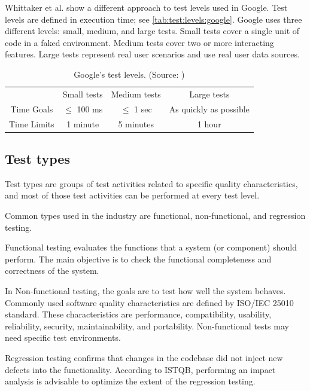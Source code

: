 Whittaker et al. show \cite{google:2012} a different approach to test levels used
in Google.
Test levels are defined in execution time; see \autoref{tab:test:levels:google}.
Google uses three different levels: small, medium, and large tests.
Small tests cover a single unit of code in a faked environment.
Medium tests cover two or more interacting features.
Large tests represent real user scenarios and use real user data sources.

\begin{table}
    \centering
    \begin{tabular}{|c c c c|}
        \hline
                    & Small tests   & Medium tests & Large tests            \\
        Time Goals  & $\leq$ 100 ms & $\leq$ 1 sec & As quickly as possible \\
        Time Limits & 1 minute      & 5 minutes    & 1 hour                 \\
        \hline
    \end{tabular}
    \caption{Google's test levels. (Source: \cite{google:2012})}
    \label{tab:test:levels:google}
\end{table}

\subsection{Test types}
Test types are groups of test activities related to specific quality characteristics, and most of those test activities can be performed at every test level. \cite{ctfl_syllabus:2023}

Common types used in the industry are functional, non-functional, and regression testing.

Functional testing evaluates the functions that a system (or component) should perform. The main objective is to check the functional completeness and correctness of the system.

In Non-functional testing, the goals are to test how well the system behaves. Commonly used software quality characteristics are defined by ISO/IEC 25010 standard\cite{iso_25010:2011}. These characteristics are performance, compatibility, usability, reliability, security, maintainability, and portability. Non-functional tests may need specific test environments.

Regression testing confirms that changes in the codebase did not inject new defects into the functionality. According to ISTQB, performing an impact analysis is advisable to optimize the extent of the regression testing.


